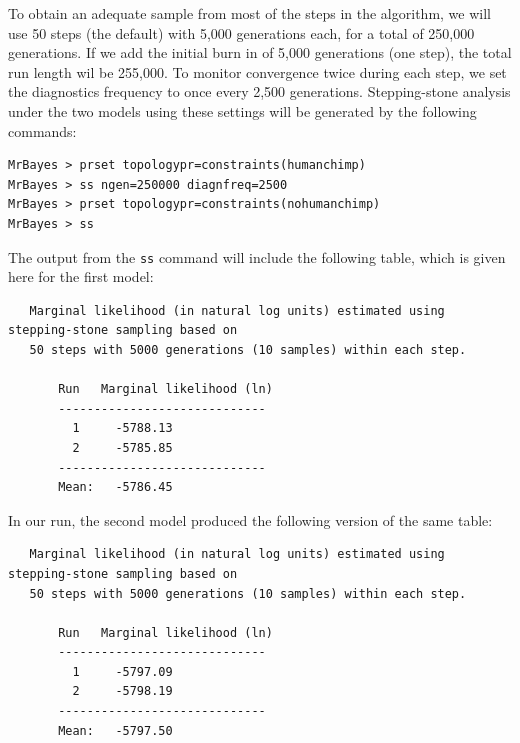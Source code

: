 \documentclass[12pt]{book}
\newcommand{\ttt}[1]{\texttt{#1}}
\begin{document}
To obtain an adequate sample from most of the steps in the algorithm, we will use 50 steps (the
default) with 5,000 generations each, for a total of 250,000 generations. If we add the initial
burn in of 5,000 generations (one step), the total run length wil be 255,000. To monitor
convergence twice during each step, we set the diagnostics frequency to once every 2,500
generations. Stepping-stone analysis under the two models using these settings will be generated by
the following commands:

\begin{singlespacing}
\begin{verbatim}
MrBayes > prset topologypr=constraints(humanchimp)
MrBayes > ss ngen=250000 diagnfreq=2500
MrBayes > prset topologypr=constraints(nohumanchimp)
MrBayes > ss
\end{verbatim}
\end{singlespacing}

The output from the \ttt{ss} command will include the following table, which is given here for the
first model:

\scriptsize
\begin{singlespacing}
\begin{verbatim}
   Marginal likelihood (in natural log units) estimated using stepping-stone sampling based on
   50 steps with 5000 generations (10 samples) within each step. 

       Run   Marginal likelihood (ln)
       -----------------------------
         1     -5788.13   
         2     -5785.85   
       -----------------------------
       Mean:   -5786.45
\end{verbatim}
\end{singlespacing}
\normalsize

In our run, the second model produced the following version of the same table:

\scriptsize
\begin{singlespacing}
\begin{verbatim}
   Marginal likelihood (in natural log units) estimated using stepping-stone sampling based on
   50 steps with 5000 generations (10 samples) within each step. 

       Run   Marginal likelihood (ln)
       -----------------------------
         1     -5797.09   
         2     -5798.19   
       -----------------------------
       Mean:   -5797.50
\end{verbatim}
\end{singlespacing}
\normalsize
\end{document}
